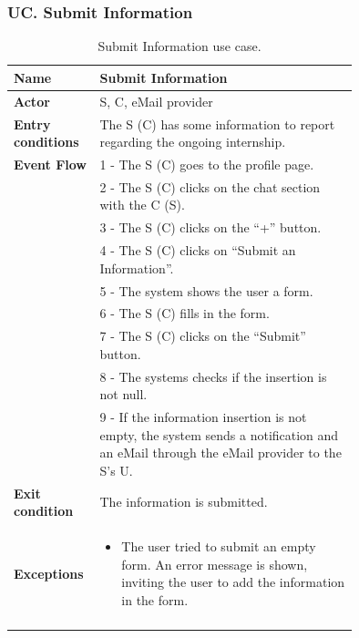 \subsubsection*{UC\cuc . Submit Information}
\begin{center}
    \begin{longtable}{|l|p{0.75\linewidth}|}
        \hline
        \textbf{Name}               & Submit Information\\
        \hline
        \textbf{Actor}              & S, C, eMail provider\\
        \hline
        \textbf{Entry conditions}   & The S (C) has some information to report regarding the ongoing internship.\\
        \hline
        \textbf{Event Flow}         & 1 - The S (C) goes to the profile page. \\
        & 2 - The S (C) clicks on the chat section with the C (S). \\
        & 3 - The S (C) clicks on the “+” button. \\
        & 4 - The S (C) clicks on “Submit an Information”. \\
        & 5 - The system shows the user a form. \\
        & 6 - The S (C) fills in the form. \\
        & 7 - The S (C) clicks on the “Submit” button. \\
        & 8 - The systems checks if the insertion is not null. \\
        & 9 - If the information insertion is not empty, the system sends a notification and an eMail through the eMail provider to the S’s U. \\
        \hline
        \textbf{Exit condition}   & The information is submitted. \\       
        \hline
        \textbf{Exceptions}       & \begin{itemize}
            \item The user tried to submit an empty form. An error message is shown, inviting the user to add the information in the form.
        \end{itemize}\\
        \hline
        \caption{Submit Information use case.}
        \label{tab: submit_information_use_case}
    \end{longtable}
\end{center}


